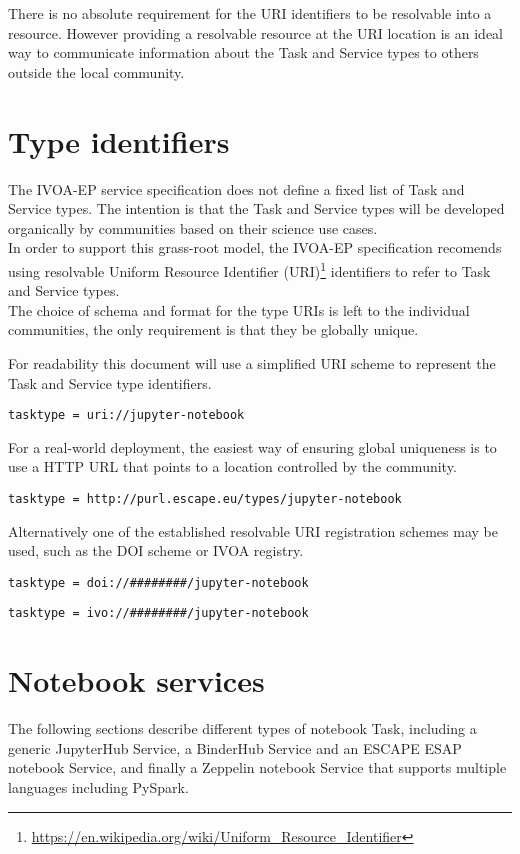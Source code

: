 \documentclass[11pt,a4paper]{ivoa}
\newcommand{\ivoep} {IVOA-EP\xspace}
\newcommand{\binderhub} {BinderHub\xspace}
\newcommand{\jupyterhub} {JupyterHub\xspace}
\newcommand{\esap} {ESAP\xspace}
\newcommand{\escape} {ESCAPE\xspace}
\newcommand{\pyspark} {PySpark\xspace}
\newcommand{\zeppelin} {Zeppelin\xspace}
\newcommand{\footurl}[1] {\footnote{\url{#1}}}
\begin{document}
There is no absolute requirement for the URI identifiers to be resolvable into a resource.
However providing a resolvable resource at the URI location is an ideal way to communicate information about the Task and Service types to others outside the local community.

\section{Type identifiers}
\label{sec:type-identifiers}
The \ivoep service specification does not define a fixed list of Task and Service types.
The intention is that the Task and Service types will be developed organically by communities based on their science use cases.
\\
In order to support this grass-root model, the \ivoep specification recomends using resolvable Uniform Resource Identifier (URI)\footurl{https://en.wikipedia.org/wiki/Uniform_Resource_Identifier} identifiers to refer to Task and Service types.
\\
The choice of schema and format for the type URIs is left to the individual communities, the only requirement is that they be globally unique.

For readability this document will use a simplified URI scheme to represent the Task and Service type identifiers.
\begin{lstlisting}[]
    tasktype = uri://jupyter-notebook
\end{lstlisting}

For a real-world deployment, the easiest way of ensuring global uniqueness is to use a HTTP URL that points to a location controlled by the community.
\begin{lstlisting}[]
    tasktype = http://purl.escape.eu/types/jupyter-notebook
\end{lstlisting}
Alternatively one of the established resolvable URI registration schemes may be used, such as the DOI scheme or IVOA registry.
\begin{lstlisting}[]
    tasktype = doi://########/jupyter-notebook
\end{lstlisting}
\begin{lstlisting}[]
    tasktype = ivo://########/jupyter-notebook
\end{lstlisting}


\section{Notebook services}
\label{sec:notebook-services}
The following sections describe different types of notebook Task, including a generic \jupyterhub Service, a \binderhub Service and an \escape \esap notebook Service, and finally a \zeppelin notebook Service that supports multiple languages including \pyspark.
\end{document}
